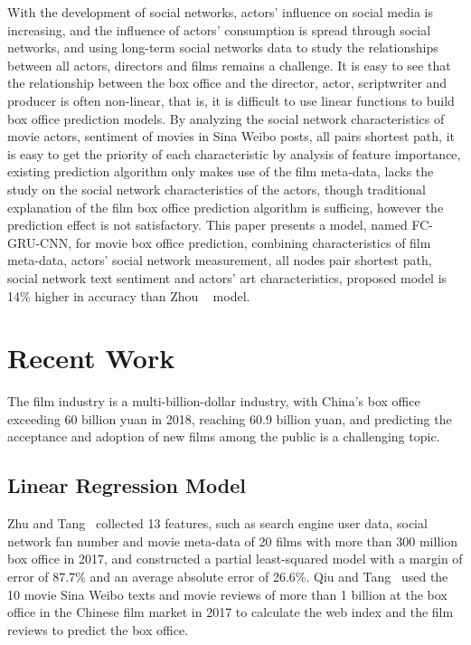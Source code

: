 \documentclass[review]{cvpr}
\begin{document}
With the development of social networks, actors' influence on social media is increasing, and the influence of actors' consumption is spread through social networks,
and using long-term social networks data to study the relationships between all actors, directors and films remains a challenge.
It is easy to see that the relationship between the box office and the director, actor, scriptwriter and producer is often non-linear, that is, it is difficult to use linear functions to build box office prediction models.
By analyzing the social network characteristics of movie actors, sentiment of movies in Sina Weibo posts, all pairs shortest path, it is easy to get the priority of each characteristic by analysis of feature importance,
existing prediction algorithm only makes use of the film meta-data, lacks the study on the social network characteristics of the actors, though traditional explanation of the film box office prediction algorithm is sufficing, however the prediction effect is not satisfactory.
This paper presents a model, named FC-GRU-CNN, for movie box office prediction, combining characteristics of film meta-data, actors' social network measurement,
all nodes pair shortest path, social network text sentiment and actors' art characteristics, proposed model is 14\% higher in accuracy than Zhou \etal~\cite{zhou2015c} model.


\section{Recent Work}

The film industry is a multi-billion-dollar industry, with China's box office exceeding 60 billion yuan in 2018, reaching 60.9 billion yuan, and predicting the acceptance and adoption of new films among the public is a challenging topic.

\subsection{Linear Regression Model}

Zhu and Tang~\cite{zhu2019film} collected 13 features, such as search engine user data, social network fan number and movie meta-data of 20 films with more than 300 million box office in 2017,
and constructed a partial least-squared model with a margin of error of 87.7\% and an average absolute error of 26.6\%.
Qiu and Tang~\cite{qiu2018microblog} used the 10 movie Sina Weibo texts and movie reviews of more than 1 billion at the box office in the Chinese film market in 2017 to calculate the web index and the film reviews to predict the box office.
\end{document}
